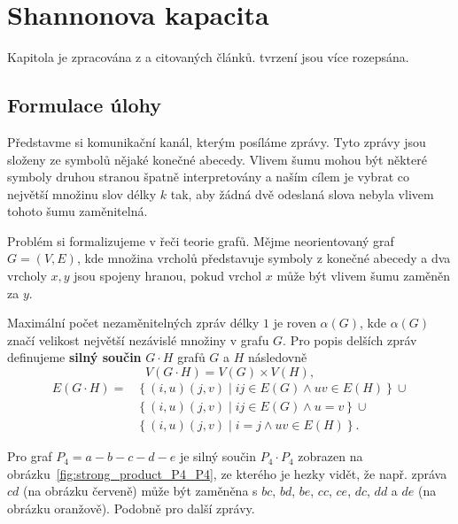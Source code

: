 \chapter{Shannonova kapacita}

Kapitola je zpracována z \cite{approximation-algorithms-and-semidefinite-programming} a citovaných článků.  tvrzení jsou více rozepsána.

\section{Formulace úlohy}

Představme si komunikační kanál, kterým posíláme zprávy. Tyto zprávy jsou složeny ze symbolů nějaké konečné abecedy. Vlivem šumu mohou být některé symboly druhou stranou špatně interpretovány a naším cílem je vybrat co největší množinu slov délky $k$ tak, aby žádná dvě odeslaná slova nebyla vlivem tohoto šumu zaměnitelná.

Problém si formalizujeme v řeči teorie grafů. Mějme neorientovaný graf $G = (V, E)$, kde množina vrcholů představuje symboly z konečné abecedy a dva vrcholy $x, y$ jsou spojeny hranou, pokud vrchol $x$ může být vlivem šumu zaměněn za $y$.

Maximální počet nezaměnitelných zpráv délky $1$ je roven $\alpha(G)$, kde $\alpha(G)$ značí velikost největší nezávislé množiny v grafu $G$. Pro popis delších zpráv definujeme \textbf{silný součin} $G \cdot H$ grafů $G$ a $H$ následovně
\begin{equation*}
    V(G \cdot H) = V(G) \times V(H),
\end{equation*}
\begin{equation*}
    \begin{split}
    E(G \cdot H) = &\left\{ (i,u)(j,v) \mid ij \in E(G) \wedge uv \in E(H) \right\} \cup \\
                   &\left\{ (i,u)(j,v) \mid ij \in E(G) \wedge u = v \right\} \cup \\
                   &\left\{ (i,u)(j,v) \mid i = j \wedge uv \in E(H) \right\}.
    \end{split}
\end{equation*}

\begin{pr}
Pro graf $P_4 = a-b-c-d-e$ je silný součin $P_4 \cdot P_4$ zobrazen na obrázku~\ref{fig:strong_product_P4_P4}, ze kterého je hezky vidět, že např. zpráva $cd$ (na obrázku červeně) může být zaměněna s $bc$, $bd$, $be$, $cc$, $ce$, $dc$, $dd$ a $de$ (na obrázku oranžově). Podobně pro další zprávy.
\end{pr}

